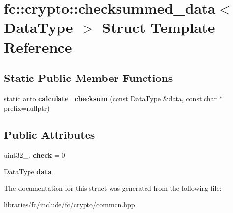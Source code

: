 \hypertarget{structfc_1_1crypto_1_1checksummed__data}{}\section{fc\+:\+:crypto\+:\+:checksummed\+\_\+data$<$ Data\+Type $>$ Struct Template Reference}
\label{structfc_1_1crypto_1_1checksummed__data}
\subsection*{Static Public Member Functions}
\begin{DoxyCompactItemize}
\item 
\mbox{\label{structfc_1_1crypto_1_1checksummed__data_a7ce7f7d88ebeb49c7ef7edb227b751fd}} 
static auto {\bfseries calculate\+\_\+checksum} (const Data\+Type \&data, const char $\ast$prefix=nullptr)
\end{DoxyCompactItemize}
\subsection*{Public Attributes}
\begin{DoxyCompactItemize}
\item 
\mbox{\label{structfc_1_1crypto_1_1checksummed__data_adb4ec9905a3b83f46b8ecaf5ae3b583c}} 
uint32\+\_\+t {\bfseries check} = 0
\item 
\mbox{\label{structfc_1_1crypto_1_1checksummed__data_a16be7bf9dccbcd7dc8c9cd396f83a15c}} 
Data\+Type {\bfseries data}
\end{DoxyCompactItemize}


The documentation for this struct was generated from the following file\+:\begin{DoxyCompactItemize}
\item 
libraries/fc/include/fc/crypto/common.\+hpp\end{DoxyCompactItemize}
